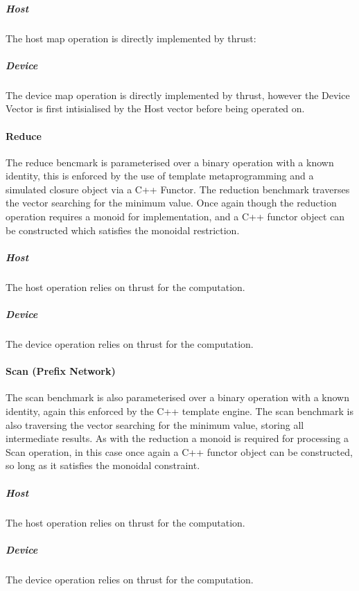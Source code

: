 \subparagraph{Host}
The host map operation is directly implemented by thrust:


\subparagraph{Device}
The device map operation is directly implemented by thrust, however the Device Vector is first
intisialised by the Host vector before being operated on.



\paragraph{Reduce}
The reduce bencmark is parameterised over a binary operation with a known identity, this is enforced
by the use of template metaprogramming and a simulated closure object via a C++ Functor. The
reduction benchmark traverses the vector searching for the minimum value. Once again though the
reduction operation requires a monoid for implementation, and a C++ functor object can be
constructed which satisfies the monoidal restriction.

\subparagraph{Host}
The host operation relies on thrust for the computation.


\subparagraph{Device}
The device operation relies on thrust for the computation.



\paragraph{Scan (Prefix Network)}
The scan benchmark is also parameterised over a binary operation with a known identity, again this
enforced by the C++ template engine. The scan benchmark is also traversing the vector searching for
the minimum value, storing all intermediate results. As with the reduction a monoid is required for
processing a Scan operation, in this case once again a C++ functor object can be constructed, so
long as it satisfies the monoidal constraint.

\subparagraph{Host}
The host operation relies on thrust for the computation.


\subparagraph{Device}
The device operation relies on thrust for the computation.


